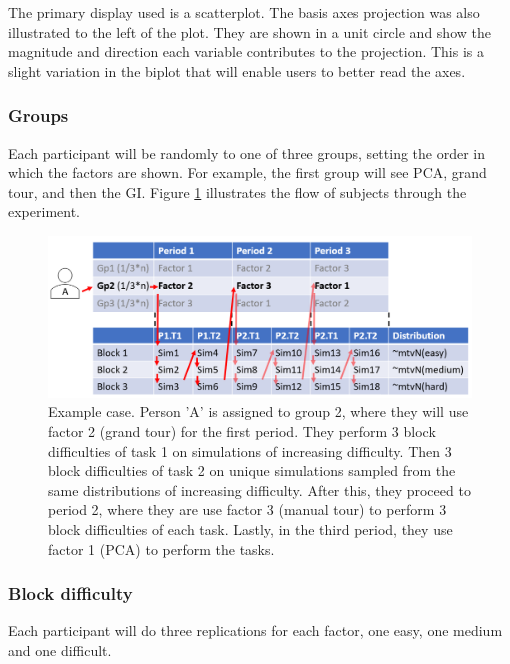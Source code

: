 \documentclass[11,]{article}
\begin{document}
The primary display used is a scatterplot. The basis axes projection was also illustrated to the left of the plot. They are shown in a unit circle and show the magnitude and direction each variable contributes to the projection. This is a slight variation in the biplot that will enable users to better read the axes.

\hypertarget{sec:groups}{%
\subsubsection{Groups}\label{sec:groups}}

Each participant will be randomly to one of three groups, setting the order in which the factors are shown. For example, the first group will see PCA, grand tour, and then the GI. Figure \ref{fig:designExample} illustrates the flow of subjects through the experiment.

\begin{figure}[h]

{\centering \includegraphics[width=0.8\linewidth,]{./figures/experimental_design_personA} 

}

\caption{Example case. Person 'A' is assigned to group 2, where they will use factor 2 (grand tour) for the first period. They perform 3 block difficulties of task 1 on simulations of increasing difficulty. Then 3 block difficulties of task 2 on unique simulations sampled from the same distributions of increasing difficulty. After this, they proceed to period 2, where they are use factor 3 (manual tour) to perform 3 block difficulties of each task. Lastly, in the third period, they use factor 1 (PCA) to perform the tasks.}\label{fig:designExample}
\end{figure}

\hypertarget{sec:blocks}{%
\subsubsection{Block difficulty}\label{sec:blocks}}

Each participant will do three replications for each factor, one easy, one medium and one difficult.
\end{document}
